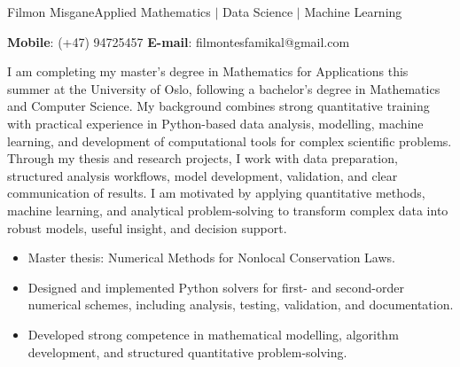 \documentclass{article}
\begin{document}
\begin{cv}{Filmon Misgane}{Applied Mathematics $|$ Data Science $|$ Machine Learning}

    \textbf{Mobile}: (+47) 94725457 \quad \textbf{E-mail}: filmontesfamikal@gmail.com

    I am completing my master's degree in Mathematics for Applications this summer at the University of Oslo, following a bachelor's degree in Mathematics and Computer Science. My background combines strong quantitative training with practical experience in Python-based data analysis, modelling, machine learning, and development of computational tools for complex scientific problems. Through my thesis and research projects, I work with data preparation, structured analysis workflows, model development, validation, and clear communication of results. I am motivated by applying quantitative methods, machine learning, and analytical problem-solving to transform complex data into robust models, useful insight, and decision support.

    \begin{cvevent}[08.2024][Present] 
        \begin{itemize}
            \item Master thesis: Numerical Methods for Nonlocal Conservation Laws.
            \item Designed and implemented Python solvers for first- and second-order numerical schemes, including analysis, testing, validation, and documentation.
            \item Developed strong competence in mathematical modelling, algorithm development, and structured quantitative problem-solving.
        \end{itemize}
        \hrulefill
    \end{cvevent}

    \begin{cvevent}[08.2021][06.2024] 
        \hrulefill
    \end{cvevent}


\end{cv}
\end{document}
